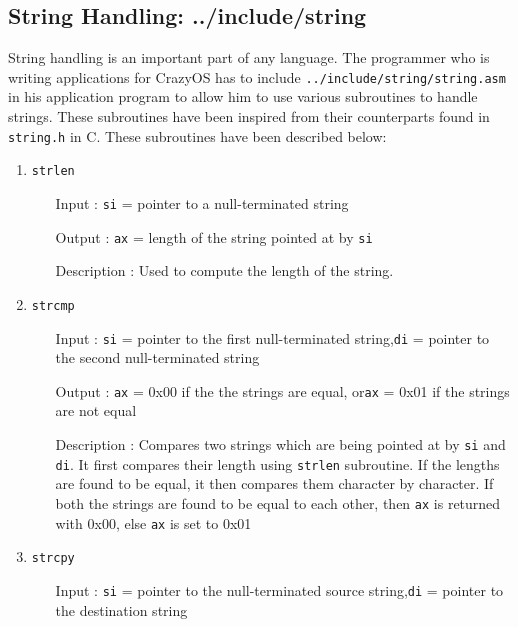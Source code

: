 \subsection{String Handling: ../include/string}
String handling is an important part of any language. The programmer who is writing applications for CrazyOS has to include \texttt{../include/string/string.asm} in his application program to allow him to use various subroutines to handle strings. These subroutines have been inspired from their counterparts found in \texttt{string.h} in C. These subroutines have been described below:
\begin{enumerate}
  \item \texttt{strlen}
  		\begin{enumerate}[align=parleft, labelsep=2cm, leftmargin=1.06in]
  		  \item[Input]: \texttt{si} = pointer to a null-terminated string
  		  \item[Output]: \texttt{ax} = length of the string pointed at by \texttt{si}
  		  \item[Description]: Used to compute the length of the string.
  		\end{enumerate}
  \item \texttt{strcmp}
  		\begin{enumerate}[align=parleft, labelsep=2cm, leftmargin=1.06in]
  		  \item[Input]: \texttt{si} = pointer to the first null-terminated string,\newline\texttt{di} = pointer to the second null-terminated string
  		  \item[Output]: \texttt{ax} = 0x00 if the the strings are equal, or\newline\texttt{ax} = 0x01 if the strings are not equal
  		  \item[Description]: Compares two strings which are being pointed at by \texttt{si} and \texttt{di}. It first compares their length using \texttt{strlen} subroutine. If the lengths are found to be equal, it then compares them character by character. If both the strings are found to be equal to each other, then \texttt{ax} is returned with 0x00, else \texttt{ax} is set to 0x01
  		\end{enumerate}
  \item \texttt{strcpy}
  		\begin{enumerate}[align=parleft, labelsep=2cm, leftmargin=1.06in]
  		  \item[Input]: \texttt{si} = pointer to the null-terminated source string,\newline\texttt{di} = pointer to the destination string

\end{enumerate}
\end{enumerate}
